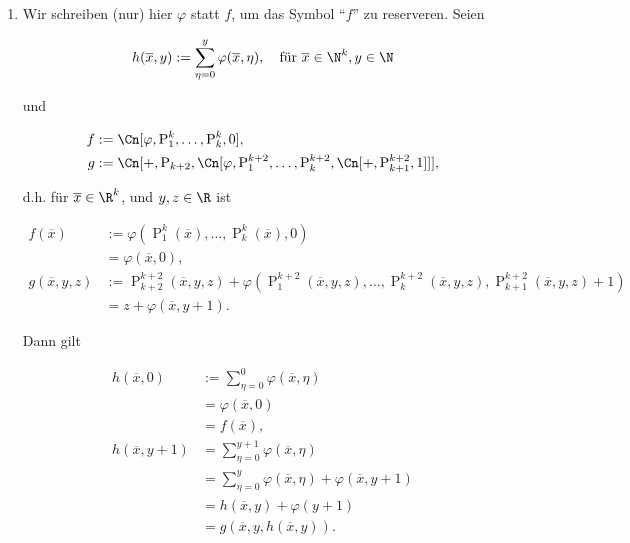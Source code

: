 \begin{solution}

\phantom{}

\begin{enumerate}[label = (\alph*)]

    \item Wir schreiben (nur) hier $\varphi$ statt $f$, um das Symbol \enquote{$f$} zu reserveren.
    Seien

    \begin{align*}
        h(\overline x, y)
        :=
        \sum_{\eta = 0}^y
            \varphi(\overline x, \eta),
        \quad
        \text{für}~
        \overline x \in \N^k,
        y \in \N
    \end{align*}

    und

    \begin{align*}
        f & := \Cn[\varphi, \operatorname P_1^k, \dots, \operatorname P_k^k, 0], \\
        g & := \Cn[+, \operatorname P_{k+2}, \Cn[\varphi, \operatorname P_1^{k+2}, \dots, \operatorname P_k^{k+2}, \Cn[+, \operatorname P_{k+1}^{k+2}, 1]]],
    \end{align*}

    d.h. für $\overline x \in \R^k$, und $y, z \in \R$ ist

    \begin{align*}
        f(\overline x)
        & :=
        \varphi(\operatorname P_1^k(\overline x), \dots, \operatorname P_k^k(\overline x), 0) \\
        & =
        \varphi(\overline x, 0), \\
        g(\overline x, y, z)
        & :=
        \operatorname P_{k+2}^{k+2}(\overline x, y, z)
        +
        \varphi(\operatorname P_1^{k+2}(\overline x, y, z), \dots, \operatorname P_k^{k+2}(\overline x, y, z), \operatorname P_{k+1}^{k+2}(\overline x, y, z) + 1) \\
        & =
        z + \varphi(\overline x, y + 1).
    \end{align*}

    Dann gilt

    \begin{align*}
        h(\overline x, 0)
        & :=
        \sum_{\eta = 0}^0
            \varphi(\overline x, \eta) \\
        & =
        \varphi(\overline x, 0) \\
        & =
        f(\overline x), \\
        h(\overline x, y + 1)
        & =
        \sum_{\eta = 0}^{y+1}
            \varphi(\overline x, \eta) \\
        & =
        \sum_{\eta = 0}^y
            \varphi(\overline x, \eta)
        +
        \varphi(\overline x, y + 1) \\
        & =
        h(\overline x, y) + \varphi(y + 1) \\
        & =
        g(\overline x, y, h(\overline x, y)).
    \end{align*}


\end{enumerate}
\end{solution}
